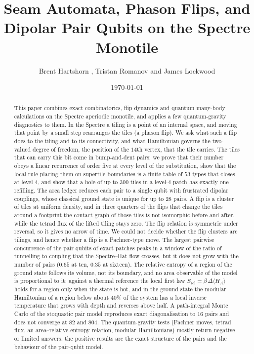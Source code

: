 \documentclass[11pt]{article}
\title{Seam Automata, Phason Flips, and Dipolar Pair Qubits on the Spectre Monotile}
\author{Brent Hartshorn \orcidlink{0009-0004-2853-655X}, Tristan Romanov and James Lockwood}
\date{\today}
\theoremstyle{definition}
\begin{document}
\maketitle

\begin{abstract}
\noindent This paper combines exact combinatorics, flip dynamics and quantum many-body calculations on the Spectre aperiodic monotile, and applies a few quantum-gravity diagnostics to them. In the Spectre a tiling is a point of an internal space, and moving that point by a small step rearranges the tiles (a phason flip). We ask what such a flip does to the tiling and to its connectivity, and what Hamiltonian governs the two-valued degree of freedom, the position of the $14$th vertex, that the tile carries. The tiles that can carry this bit come in bump-and-dent pairs; we prove that their number obeys a linear recurrence of order five at every level of the substitution, show that the local rule placing them on supertile boundaries is a finite table of $53$ types that closes at level $4$, and show that a hole of up to $300$ tiles in a level-$4$ patch has exactly one refilling. The area ledger reduces each pair to a single qubit with frustrated dipolar couplings, whose classical ground state is unique for up to $28$ pairs. A flip is a cluster of tiles at uniform density, and in three quarters of the flips that change the tiles around a footprint the contact graph of those tiles is not isomorphic before and after, while the tetrad flux of the lifted tiling stays zero. The flip relation is symmetric under reversal, so it gives no arrow of time. We could not decide whether the flip clusters are tilings, and hence whether a flip is a Pachner-type move. The largest pairwise concurrence of the pair qubits of exact patches peaks in a window of the ratio of tunnelling to coupling that the Spectre--Hat flow crosses, but it does not grow with the number of pairs ($0.65$ at ten, $0.35$ at sixteen). The relative entropy of a region of the ground state follows its volume, not its boundary, and no area observable of the model is proportional to it; against a thermal reference the local first law $S_{\mathrm{rel}}=\beta\,\Delta\langle H_A\rangle$ holds for a region only when the state is hot, and in the ground state the modular Hamiltonian of a region below about $40\%$ of the system has a local inverse temperature that grows with depth and reverses above half. A path-integral Monte Carlo of the stoquastic pair model reproduces exact diagonalisation to $16$ pairs and does not converge at $82$ and $804$. The quantum-gravity tests (Pachner moves, tetrad flux, an area--relative-entropy relation, modular Hamiltonians) mostly return negative or limited answers; the positive results are the exact structure of the pairs and the behaviour of the pair-qubit model.
\end{abstract}
\end{document}
